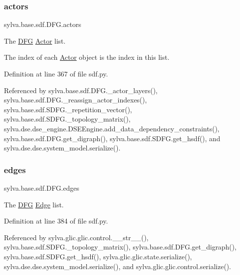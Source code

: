\subsubsection{\texorpdfstring{actors}{actors}}
{\footnotesize\ttfamily sylva.\+base.\+sdf.\+D\+F\+G.\+actors}



The \hyperlink{classsylva_1_1base_1_1sdf_1_1_d_f_g}{D\+FG} \hyperlink{classsylva_1_1base_1_1sdf_1_1_actor}{Actor} list. 

The index of each \hyperlink{classsylva_1_1base_1_1sdf_1_1_actor}{Actor} object is the index in this list. 

Definition at line 367 of file sdf.\+py.



Referenced by sylva.\+base.\+sdf.\+D\+F\+G.\+\_\+actor\+\_\+layers(), sylva.\+base.\+sdf.\+D\+F\+G.\+\_\+reassign\+\_\+actor\+\_\+indexes(), sylva.\+base.\+sdf.\+S\+D\+F\+G.\+\_\+repetition\+\_\+vector(), sylva.\+base.\+sdf.\+S\+D\+F\+G.\+\_\+topology\+\_\+matrix(), sylva.\+dse.\+dse\+\_\+engine.\+D\+S\+E\+Engine.\+add\+\_\+data\+\_\+dependency\+\_\+constraints(), sylva.\+base.\+sdf.\+D\+F\+G.\+get\+\_\+digraph(), sylva.\+base.\+sdf.\+S\+D\+F\+G.\+get\+\_\+hsdf(), and sylva.\+dse.\+dse.\+system\+\_\+model.\+serialize().

\mbox{\label{classsylva_1_1base_1_1sdf_1_1_d_f_g_a565dfad69749ebe807f3db745fffe50d}} 
\subsubsection{\texorpdfstring{edges}{edges}}
{\footnotesize\ttfamily sylva.\+base.\+sdf.\+D\+F\+G.\+edges}



The \hyperlink{classsylva_1_1base_1_1sdf_1_1_d_f_g}{D\+FG} \hyperlink{classsylva_1_1base_1_1sdf_1_1_edge}{Edge} list. 



Definition at line 384 of file sdf.\+py.



Referenced by sylva.\+glic.\+glic.\+control.\+\_\+\+\_\+str\+\_\+\+\_\+(), sylva.\+base.\+sdf.\+S\+D\+F\+G.\+\_\+topology\+\_\+matrix(), sylva.\+base.\+sdf.\+D\+F\+G.\+get\+\_\+digraph(), sylva.\+base.\+sdf.\+S\+D\+F\+G.\+get\+\_\+hsdf(), sylva.\+glic.\+glic.\+state.\+serialize(), sylva.\+dse.\+dse.\+system\+\_\+model.\+serialize(), and sylva.\+glic.\+glic.\+control.\+serialize().



